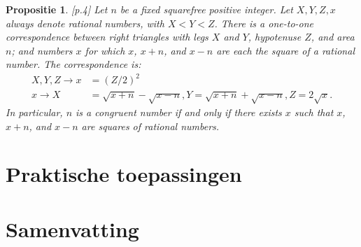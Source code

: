 \documentclass[12pt,reqno]{article}
\theoremstyle{theorem}
\newtheorem{proposition}[theorem]{Propositie}
\theoremstyle{definition}
\begin{document}
	\begin{proposition}
		\cite{Koblitz}[p.4] Let $n$ be a fixed squarefree positive integer. Let $X,Y,Z,x$ always denote rational numbers, with $X<Y<Z$. There is a one-to-one correspondence between right triangles with legs $X$ and $Y$, hypotenuse $Z$, and area $n$; and numbers $x$ for which $x$, $x+n$, and $x-n$ are each the square of a rational number. The correspondence is:
		\begin{align*}
		X,Y,Z\rightarrow x &= (Z/2)^2 \\
		x\rightarrow X &= \sqrt{x+n} - \sqrt{x-n}, Y = \sqrt{x+n}+\sqrt{x-n}, Z = 2\sqrt{x}.
		\end{align*}
		In particular, $n$ is a congruent number if and only if there exists $x$ such that $x$, $x+n$, and $x-n$ are squares of rational numbers.
	\end{proposition}
	
	\section{Praktische toepassingen}
	
	\section{Samenvatting}
	
	
	
	
\end{document}
